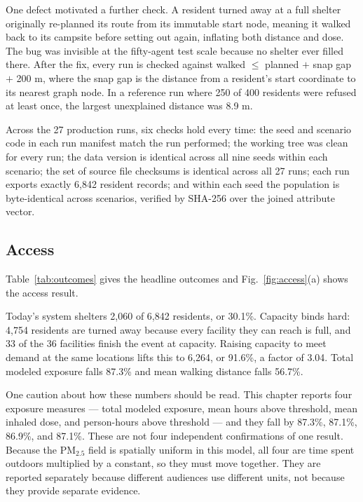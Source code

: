 \documentclass[graybox]{svmult}
\begin{document}
One defect motivated a further check. A resident turned away at a full shelter
originally re-planned its route from its immutable start node, meaning it walked
back to its campsite before setting out again, inflating both distance and dose.
The bug was invisible at the fifty-agent test scale because no shelter ever
filled there. After the fix, every run is checked against walked $\le$ planned
$+$ snap gap $+$ 200 m, where the snap gap is the distance from a resident's
start coordinate to its nearest graph node. In a reference run where 250 of 400
residents were refused at least once, the largest unexplained distance was 8.9 m.

Across the 27 production runs, six checks hold every time: the seed and scenario
code in each run manifest match the run performed; the working tree was clean for
every run; the data version is identical across all nine seeds within each
scenario; the set of source file checksums is identical across all 27 runs; each
run exports exactly 6,842 resident records; and within each seed the population
is byte-identical across scenarios, verified by SHA-256 over the joined attribute
vector.

\subsection{Access}
\label{sec:access}

Table~\ref{tab:outcomes} gives the headline outcomes and Fig.~\ref{fig:access}(a)
shows the access result.

Today's system shelters 2,060 of 6,842 residents, or 30.1\%. Capacity binds hard:
4,754 residents are turned away because every facility they can reach is full,
and 33 of the 36 facilities finish the event at capacity. Raising capacity to
meet demand at the same locations lifts this to 6,264, or 91.6\%, a factor of
3.04. Total modeled exposure falls 87.3\% and mean walking distance falls 56.7\%.

One caution about how these numbers should be read. This chapter reports four
exposure measures --- total modeled exposure, mean hours above threshold, mean
inhaled dose, and person-hours above threshold --- and they fall by 87.3\%,
87.1\%, 86.9\%, and 87.1\%. These are not four independent confirmations of one
result. Because the PM$_{2.5}$ field is spatially uniform in this model, all four
are time spent outdoors multiplied by a constant, so they must move together.
They are reported separately because different audiences use different units, not
because they provide separate evidence.
\end{document}
